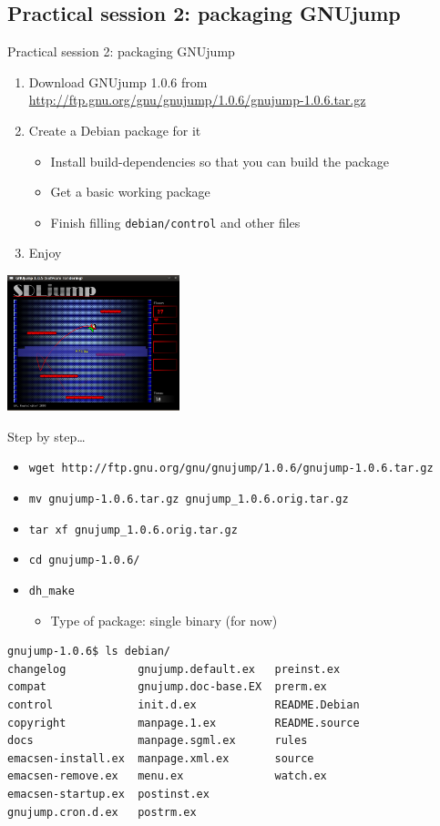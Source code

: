 \documentclass[10pt,final]{beamer}
\begin{document}
\subsection{Practical session 2: packaging GNUjump}
\begin{frame}{Practical session 2: packaging GNUjump}
\begin{enumerate}
	\item Download GNUjump 1.0.6 from
		\url{http://ftp.gnu.org/gnu/gnujump/1.0.6/gnujump-1.0.6.tar.gz}
		\br
	\item Create a Debian package for it
		\begin{itemize}
			\item Install build-dependencies so that you can build the package
			\item Get a basic working package
			\item Finish filling \texttt{debian/control} and other files
		\end{itemize}
		\br
	\item Enjoy
\end{enumerate}
\centerline{\includegraphics[width=5cm]{figs/gnujump.png}}
\end{frame}

\begin{frame}[fragile]{Step by step\ldots}
\begin{itemize}
	\item \texttt{wget http://ftp.gnu.org/gnu/gnujump/1.0.6/gnujump-1.0.6.tar.gz}
		\hbr
	\item \texttt{mv gnujump-1.0.6.tar.gz gnujump\_1.0.6.orig.tar.gz}
		\hbr
	\item \texttt{tar xf gnujump\_1.0.6.orig.tar.gz}
		\hbr
	\item \texttt{cd gnujump-1.0.6/}
		\hbr
	\item \texttt{dh\_make}
	\begin{itemize}
		\item \small Type of package: single binary (for now)
	\end{itemize}
\end{itemize}
\begin{lstlisting}[basicstyle=\ttfamily\small]
gnujump-1.0.6$ ls debian/
changelog           gnujump.default.ex   preinst.ex
compat              gnujump.doc-base.EX  prerm.ex
control             init.d.ex            README.Debian
copyright           manpage.1.ex         README.source
docs                manpage.sgml.ex      rules
emacsen-install.ex  manpage.xml.ex       source
emacsen-remove.ex   menu.ex              watch.ex
emacsen-startup.ex  postinst.ex
gnujump.cron.d.ex   postrm.ex
\end{lstlisting}
\end{frame}
\end{document}

